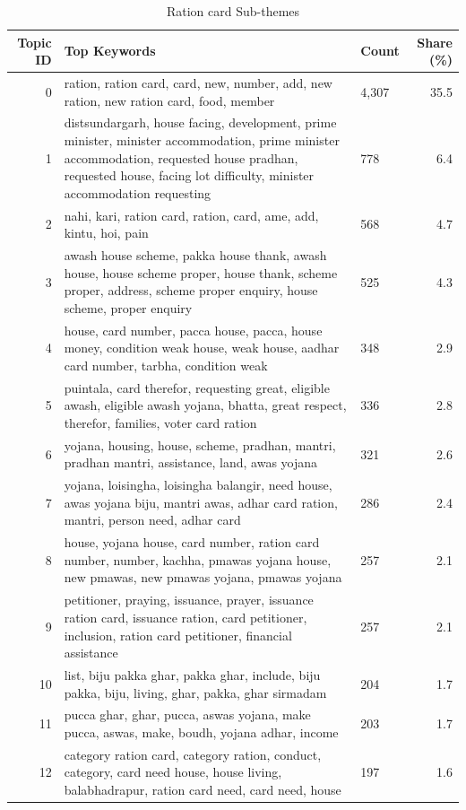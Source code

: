 \begin{table}[htbp]
\centering
\caption{Ration card Sub-themes}
\label{tab:topics_Ration_card}
\begin{tabular}{rlp{7cm}r}
\toprule
Topic ID & Top Keywords & Count & Share (\%) \\
\midrule
0 & ration, ration card, card, new, number, add, new ration, new ration card, food, member & 4,307 & 35.5 \\
1 & distsundargarh, house facing, development, prime minister, minister accommodation, prime minister accommodation, requested house pradhan, requested house, facing lot difficulty, minister accommodation requesting & 778 & 6.4 \\
2 & nahi, kari, ration card, ration, card, ame, add, kintu, hoi, pain & 568 & 4.7 \\
3 & awash house scheme, pakka house thank, awash house, house scheme proper, house thank, scheme proper, address, scheme proper enquiry, house scheme, proper enquiry & 525 & 4.3 \\
4 & house, card number, pacca house, pacca, house money, condition weak house, weak house, aadhar card number, tarbha, condition weak & 348 & 2.9 \\
5 & puintala, card therefor, requesting great, eligible awash, eligible awash yojana, bhatta, great respect, therefor, families, voter card ration & 336 & 2.8 \\
6 & yojana, housing, house, scheme, pradhan, mantri, pradhan mantri, assistance, land, awas yojana & 321 & 2.6 \\
7 & yojana, loisingha, loisingha balangir, need house, awas yojana biju, mantri awas, adhar card ration, mantri, person need, adhar card & 286 & 2.4 \\
8 & house, yojana house, card number, ration card number, number, kachha, pmawas yojana house, new pmawas, new pmawas yojana, pmawas yojana & 257 & 2.1 \\
9 & petitioner, praying, issuance, prayer, issuance ration card, issuance ration, card petitioner, inclusion, ration card petitioner, financial assistance & 257 & 2.1 \\
10 & list, biju pakka ghar, pakka ghar, include, biju pakka, biju, living, ghar, pakka, ghar sirmadam & 204 & 1.7 \\
11 & pucca ghar, ghar, pucca, aswas yojana, make pucca, aswas, make, boudh, yojana adhar, income & 203 & 1.7 \\
12 & category ration card, category ration, conduct, category, card need house, house living, balabhadrapur, ration card need, card need, house & 197 & 1.6 \\

\end{tabular}
\end{table}

